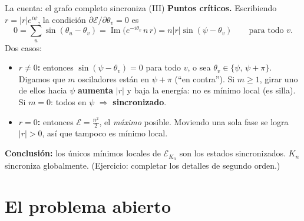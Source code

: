 \documentclass[10pt,aspectratio=169]{beamer}
\newcommand{\E}{\mathcal{E}}
\begin{document}
\begin{frame}{La cuenta: el grafo completo sincroniza (III)}
\textbf{Puntos críticos.} Escribiendo $r = |r|e^{i\psi}$, la condición $\partial\E/\partial\theta_v = 0$ es
\[
0 = \sum_u \sin(\theta_u - \theta_v) = \operatorname{Im}\bigl(e^{-i\theta_v}\, n\,r\bigr) = n|r|\sin(\psi - \theta_v)
\qquad \text{para todo } v.
\]
\pause
Dos casos:
\begin{itemize}
    \item \textbf{$r \neq 0$:} entonces $\sin(\psi-\theta_v)=0$ para todo $v$, o sea $\theta_v \in \{\psi,\, \psi+\pi\}$.\\
    Digamos que $m$ osciladores están en $\psi+\pi$ (``en contra''). Si $m \ge 1$, girar uno de ellos hacia $\psi$ \textbf{aumenta} $|r|$ y baja la energía: no es mínimo local (es silla).\\
    Si $m=0$: todos en $\psi$ $\Rightarrow$ \textbf{sincronizado}. \checkmark
    \pause
    \item \textbf{$r = 0$:} entonces $\E = \tfrac{n^2}{2}$, el \emph{máximo} posible. Moviendo una sola fase se logra $|r|>0$, así que tampoco es mínimo local.
\end{itemize}
\pause
\medskip
\textbf{Conclusión:} los únicos mínimos locales de $\E_{K_n}$ son los estados sincronizados.
$K_n$ sincroniza globalmente. \hfill (Ejercicio: completar los detalles de segundo orden.)
\end{frame}

\section{El problema abierto}
\end{document}
